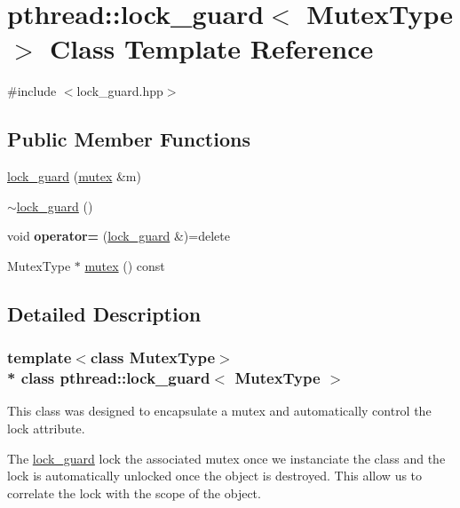 \hypertarget{classpthread_1_1lock__guard}{}\section{pthread\+:\+:lock\+\_\+guard$<$ Mutex\+Type $>$ Class Template Reference}
\label{classpthread_1_1lock__guard}


{\ttfamily \#include $<$lock\+\_\+guard.\+hpp$>$}

\subsection*{Public Member Functions}
\begin{DoxyCompactItemize}
\item 
\hyperlink{classpthread_1_1lock__guard_a720070a45ed97c9234b980bd33328a4e}{lock\+\_\+guard} (\hyperlink{classpthread_1_1mutex}{mutex} \&m)
\item 
\hyperlink{classpthread_1_1lock__guard_a958884251adfb8d5f9bd7d643cc3949f}{$\sim$lock\+\_\+guard} ()
\item 
void {\bfseries operator=} (\hyperlink{classpthread_1_1lock__guard}{lock\+\_\+guard} \&)=delete\hypertarget{classpthread_1_1lock__guard_a1f9ab705f7ffe9eb8739ff3cf34cf7f2}{}\label{classpthread_1_1lock__guard_a1f9ab705f7ffe9eb8739ff3cf34cf7f2}

\item 
Mutex\+Type $\ast$ \hyperlink{classpthread_1_1lock__guard_a03f11b486e905ea9bca764686cd86fae}{mutex} () const 
\end{DoxyCompactItemize}


\subsection{Detailed Description}
\subsubsection*{template$<$class Mutex\+Type$>$\\*
class pthread\+::lock\+\_\+guard$<$ Mutex\+Type $>$}

This class was designed to encapsulate a mutex and automatically control the lock attribute.

The \hyperlink{classpthread_1_1lock__guard}{lock\+\_\+guard} lock the associated mutex once we instanciate the class and the lock is automatically unlocked once the object is destroyed. This allow us to correlate the lock with the scope of the object.

